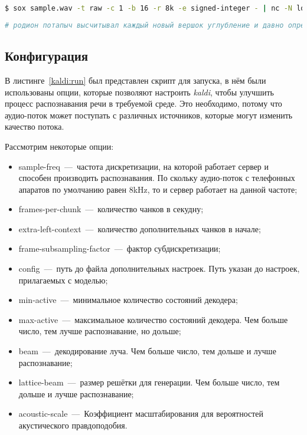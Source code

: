 \begin{lstlisting}[caption={Передача аудио-файла на распознавание речи},label={kaldi:run:check},language=bash]
$ sox sample.wav -t raw -c 1 -b 16 -r 8k -e signed-integer - | nc -N localhost 5050
\end{lstlisting}

\begin{minipage}{\linewidth}
\begin{lstlisting}[caption={Результат работы сервера распознавания речи}, label={kaldi:run:res},language=bash]
# родион потапыч высчитывал каждый новый вершок углубление и давно определил про себя
\end{lstlisting}
\end{minipage}

\subsection{Конфигурация}

В листинге~\ref{kaldi:run} был представлен скрипт для запуска, в нём были
использованы опции, которые позволяют настроить \textit{kaldi}, чтобы улучшить
процесс распознавания речи в требуемой среде. Это необходимо, потому что
аудио-поток может поступать с различных источников, которые могут изменить качество
потока.

Рассмотрим некоторые опции:
\begin{itemize} \label{kaldi:options}
    \item sample-freq~---~частота дискретизации, на которой работает сервер и способен производить распознавания.
        По скольку аудио-поток с телефонных апаратов по умолчанию равен 8kHz, то и сервер работает на данной частоте;
    \item frames-per-chunk~---~количество чанков в секудну;
    \item extra-left-context~---~количество дополнительных чанков в начале;
    \item frame-subsampling-factor~---~фактор субдискретизации;
    \item config~---~путь до файла дополнительных настроек. Путь указан до настроек, прилагаемых с моделью;
    \item min-active~---~минимальное количество состояний декодера;
    \item max-active~---~максимальное количество состояний декодера. Чем больше число, тем лучше распознавание, но дольше;
    \item beam~---~декодирование луча. Чем больше число, тем дольше и лучше распознавание;
    \item lattice-beam~---~размер решётки для генерации. Чем больше число, тем дольше и лучше распознавание;
    \item acoustic-scale~---~Коэффициент масштабирования для вероятностей акустического правдоподобия.
\end{itemize}
